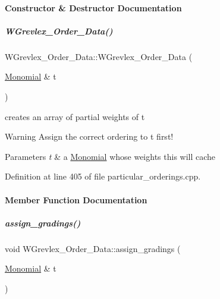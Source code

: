 \paragraph{Constructor \& Destructor Documentation}
\mbox{\label{group__orderinggroup_ad81bc55e04131b2d23371f6ce71d0422}} 
\subparagraph{\texorpdfstring{W\+Grevlex\+\_\+\+Order\+\_\+\+Data()}{WGrevlex\_Order\_Data()}}
{\footnotesize\ttfamily W\+Grevlex\+\_\+\+Order\+\_\+\+Data\+::\+W\+Grevlex\+\_\+\+Order\+\_\+\+Data (\begin{DoxyParamCaption}\item[{\hyperlink{group__polygroup_class_monomial}{Monomial} \&}]{t }\end{DoxyParamCaption})}



creates an array of partial weights of {\ttfamily t} 

\begin{DoxyWarning}{Warning}
Assign the correct ordering to {\ttfamily t} first! 
\end{DoxyWarning}

\begin{DoxyParams}{Parameters}
{\em t} & a \hyperlink{group__polygroup_class_monomial}{Monomial} whose weights {\ttfamily this} will cache \\
\hline
\end{DoxyParams}


Definition at line 405 of file particular\+\_\+orderings.\+cpp.



\paragraph{Member Function Documentation}
\mbox{\label{group__orderinggroup_a48f5464aaed30ba07d3eace69b2d87c1}} 
\subparagraph{\texorpdfstring{assign\+\_\+gradings()}{assign\_gradings()}}
{\footnotesize\ttfamily void W\+Grevlex\+\_\+\+Order\+\_\+\+Data\+::assign\+\_\+gradings (\begin{DoxyParamCaption}\item[{\hyperlink{group__polygroup_class_monomial}{Monomial} \&}]{t }\end{DoxyParamCaption})}



